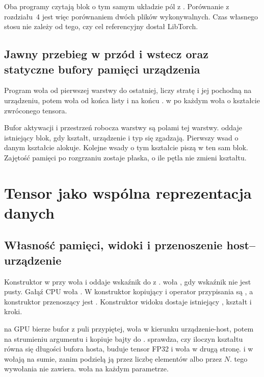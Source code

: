 Oba programy czytają blok o tym samym układzie pól z . Porównanie z rozdziału~4 jest więc porównaniem dwóch plików wykonywalnych. Czas własnego stosu nie zależy od tego, czy cel referencyjny dostał LibTorch.

\subsection{Jawny przebieg w przód i wstecz oraz statyczne bufory pamięci urządzenia}

Program woła  od pierwszej warstwy do ostatniej, liczy stratę i jej pochodną na urządzeniu, potem woła  od końca listy i na końcu .  w  po każdym  woła  o kształcie zwróconego tensora.

Bufor aktywacji i przestrzeń robocza warstwy są polami tej warstwy.  oddaje istniejący blok, gdy kształt, urządzenie i typ się zgadzają. Pierwszy wsad o danym kształcie alokuje. Kolejne wsady o tym kształcie piszą w ten sam blok. Zajętość pamięci po rozgrzaniu zostaje płaska, o ile pętla nie zmieni kształtu.

\section{Tensor jako wspólna reprezentacja danych}

\subsection{Własność pamięci, widoki i przenoszenie host--urządzenie}

Konstruktor w  przy  woła  i oddaje wskaźnik do  z .  woła , gdy wskaźnik nie jest pusty. Gałąź CPU woła . W  konstruktor kopiujący i operator przypisania są , a konstruktor przenoszący jest . Konstruktor widoku dostaje istniejący , kształt i kroki.

 na GPU bierze bufor z puli przypiętej, woła  w kierunku urządzenie-host, potem  na strumieniu argumentu i kopiuje bajty do .  sprawdza, czy iloczyn kształtu równa się długości bufora hosta, buduje tensor FP32 i woła  w drugą stronę.  i  w  wołają  na sumie, zanim podzielą ją przez liczbę elementów albo przez \(N\).  tego wywołania nie zawiera.  woła  na każdym parametrze.

